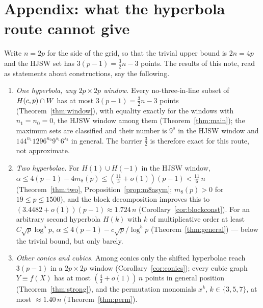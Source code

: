 \section*{Appendix: what the hyperbola route cannot give}\label{app:hyperbolae}

Write $n=2p$ for the side of the grid, so that the trivial upper bound is $2n=4p$ and the HJSW set has $3(p-1)=\tfrac32 n-3$ points.
The results of this note, read as statements about constructions, say the following.

\begin{enumerate}
\item[(a)] \emph{One hyperbola, any $2p\times2p$ window.}  Every no-three-in-line subset of $H(c,p)\cap W$ has at most $3(p-1)=\tfrac32 n-3$ points
 (Theorem~\ref{thm:window}), with equality exactly for the windows with $n_1=n_0=0$, the HJSW window among them (Theorem~\ref{thm:main});
 the maximum sets are classified and their number is $9^s$ in the HJSW window and $144^{n_1}1296^{n_0}9^{s_1}6^{s_2}$ in general.
 The barrier $\tfrac32$ is therefore exact for this route, not approximate.
\item[(b)] \emph{Two hyperbolae.}  For $H(1)\cup H(-1)$ in the HJSW window, $\alpha\le4(p-1)-4m_8(p)\le(\tfrac{11}{3}+o(1))(p-1)<\tfrac{11}{6}\,n$
 (Theorem~\ref{thm:two}, Proposition~\ref{prop:m8asym}; $m_8(p)>0$ for $19\le p\le1500$), and the block decomposition improves this to
 $(3.4482+o(1))(p-1)\approx1.724\,n$ (Corollary~\ref{cor:blockconst}).  For an arbitrary second hyperbola $H(k)$ with $k$ of multiplicative order
 at least $C\sqrt p\log^5p$, $\alpha\le4(p-1)-c\sqrt p/\log^5p$ (Theorem~\ref{thm:general}) --- below the trivial bound, but only barely.
\item[(c)] \emph{Other conics and cubics.}  Among conics only the shifted hyperbolae reach $3(p-1)$ in a $2p\times2p$ window (Corollary~\ref{cor:conics});
 every cubic graph $Y\equiv f(X)$ has at most $(\tfrac43+o(1))\,n$ points in general position (Theorem~\ref{thm:strong}), and the permutation
 monomials $x^k$, $k\in\{3,5,7\}$, at most $\approx1.40\,n$ (Theorem~\ref{thm:perm}).
\end{enumerate}

